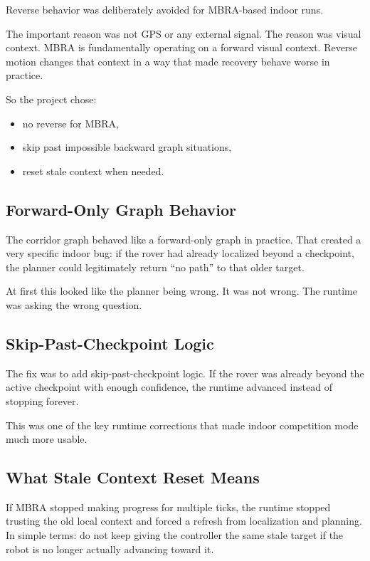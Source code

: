 \documentclass[11pt]{article}
\begin{document}
Reverse behavior was deliberately avoided for MBRA-based indoor runs.

The important reason was not GPS or any external signal. The reason was visual
context. MBRA is fundamentally operating on a forward visual context. Reverse motion
changes that context in a way that made recovery behave worse in practice.

So the project chose:

\begin{itemize}[nosep]
  \item no reverse for MBRA,
  \item skip past impossible backward graph situations,
  \item reset stale context when needed.
\end{itemize}

\subsection{Forward-Only Graph Behavior}

The corridor graph behaved like a forward-only graph in practice. That created a
very specific indoor bug: if the rover had already localized beyond a checkpoint,
the planner could legitimately return ``no path'' to that older target.

At first this looked like the planner being wrong. It was not wrong. The runtime
was asking the wrong question.

\subsection{Skip-Past-Checkpoint Logic}

The fix was to add skip-past-checkpoint logic. If the rover was already beyond the
active checkpoint with enough confidence, the runtime advanced instead of stopping
forever.

This was one of the key runtime corrections that made indoor competition mode much
more usable.

\subsection{What Stale Context Reset Means}

If MBRA stopped making progress for multiple ticks, the runtime stopped trusting the
old local context and forced a refresh from localization and planning. In simple
terms: do not keep giving the controller the same stale target if the robot is no
longer actually advancing toward it.
\end{document}
